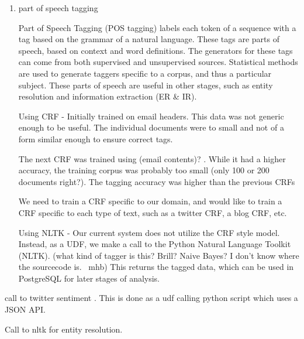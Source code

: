 \documentclass{article}
\begin{document}
\begin{enumerate}
\begin{enumerate}
\begin{enumerate}
\begin{enumerate}
        

      \item part of speech tagging
        
        Part of Speech Tagging (POS tagging) labels each token of a sequence with a tag based on the grammar of a natural language.
        These tags are parts of speech, based on context and word definitions.
        The generators for these tags can come from both supervised and unsupervised sources.
        Statistical methods are used to generate taggers specific to a corpus, and thus a particular subject.
        These parts of speech are useful in other stages, such as entity resolution and information extraction (ER \& IR).
        
        Using CRF -
        Initially trained on email headers. 
        This data was not generic enough to be useful.
        The individual documents were to small and not of a form similar enough to ensure correct tags.
        
        The next CRF was trained using (email contents)? .
        While it had a higher accuracy, the training corpus was probably too small (only 100 or 200 documents right?). 
        The tagging accuracy was higher than the previous CRFs

        We need to train a CRF specific to our domain,
        and would like to train a CRF specific to each type of text,
        such as a twitter CRF, a blog CRF, etc.

        Using NLTK -
        Our current system does not utilize the CRF style model.
        Instead, as a UDF, we make a call to the Python Natural Language Toolkit (NLTK).
        (what kind of tagger is this? Brill? Naive Bayes? I don't know where the sourcecode is. ~mhb)
        This returns the tagged data, which can be used in PostgreSQL for later stages of analysis.
        

      \end{enumerate}


      

      

      call to twitter sentiment . This is done as a udf calling python script which uses a JSON API.

      Call to nltk for entity resolution.


\end{enumerate}
\end{enumerate}
\end{enumerate}
\end{document}
